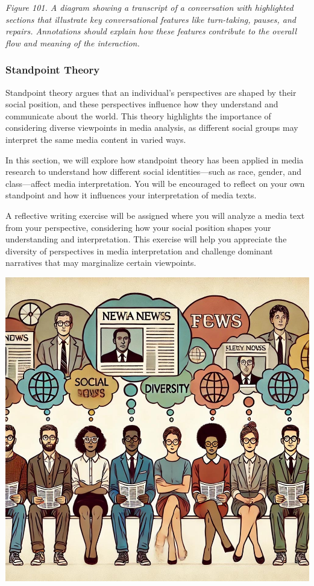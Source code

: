 \documentclass[
]{book}
\begin{document}
\emph{Figure 101. A diagram showing a transcript of a conversation with highlighted sections that illustrate key conversational features like turn-taking, pauses, and repairs. Annotations should explain how these features contribute to the overall flow and meaning of the interaction.}

\subsubsection{Standpoint Theory}\label{standpoint-theory}

Standpoint theory argues that an individual's perspectives are shaped by their social position, and these perspectives influence how they understand and communicate about the world. This theory highlights the importance of considering diverse viewpoints in media analysis, as different social groups may interpret the same media content in varied ways.

In this section, we will explore how standpoint theory has been applied in media research to understand how different social identities---such as race, gender, and class---affect media interpretation. You will be encouraged to reflect on your own standpoint and how it influences your interpretation of media texts.

A reflective writing exercise will be assigned where you will analyze a media text from your perspective, considering how your social position shapes your understanding and interpretation. This exercise will help you appreciate the diversity of perspectives in media interpretation and challenge dominant narratives that may marginalize certain viewpoints.

\includegraphics[width=1\textwidth,height=\textheight]{images/fig102.jpg}
\end{document}
